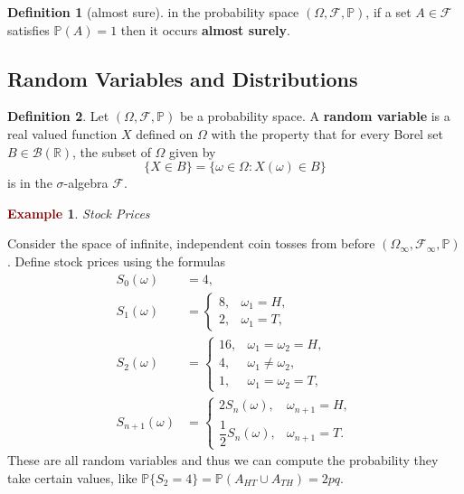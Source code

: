 \documentclass[11pt]{article}
\theoremstyle{definition}
\theoremstyle{definition}
\newcommand{\R}[0]{\mathbb{R}}
\theoremstyle{definition}
\newtheorem{definition}{\textcolor{OliveGreen}{Definition}}
\newtheorem{ex}{\textcolor{Maroon}{Example}}
\theoremstyle{remark}
\begin{document}
\begin{definition}[almost sure]
    in the probability space $(\Omega, \mathcal{F}, \mathbb{P})$, if a set 
    $A \in \mathcal{F}$ satisfies $\mathbb{P}(A) = 1$ then it occurs \textbf{almost surely}.  
\end{definition}


\subsection{Random Variables and Distributions}

\begin{definition}
    Let $(\Omega, \mathcal{F}, \mathbb{P})$ be a probability space. A \textbf{random variable} is a real valued function
    $X$ defined on $\Omega$ with the property that for every Borel set $B \in \mathcal{B}(\R)$, the subset of $\Omega$ given by
    \[
    \{X \in B\} = \{\omega \in \Omega : X(\omega) \in B\}
    \] is in the $\sigma$-algebra $\mathcal{F}$.       
\end{definition}

\begin{ex}{\textit{Stock Prices}}
    
    Consider the space of infinite, independent coin tosses from before $(\Omega_\infty, \mathcal{F}_\infty, \mathbb{P})$.
    Define stock prices using the formulas 
    \begin{align*}
S_0(\omega)
    &= 4, \\[1em]
S_1(\omega)
    &=
    \begin{cases}
        8, & \omega_1 = H,\\[4pt]
        2, & \omega_1 = T,
    \end{cases} \\[1em]
S_2(\omega)
    &=
    \begin{cases}
        16, & \omega_1 = \omega_2 = H,\\[4pt]
        4, & \omega_1 \neq \omega_2,\\[4pt]
        1, & \omega_1 = \omega_2 = T,
    \end{cases} \\[1em]
S_{n+1}(\omega)
    &=
    \begin{cases}
        2S_n(\omega), & \omega_{n+1}=H,\\[4pt]
        \dfrac12 S_n(\omega), & \omega_{n+1}=T.
    \end{cases}
\end{align*}
These are all random variables and thus we can compute the probability they take certain values, like
$\mathbb{P}\{S_2 = 4\} = \mathbb{P}(A_{HT} \cup A_{TH}) = 2pq$. 
\end{ex}
\end{document}
